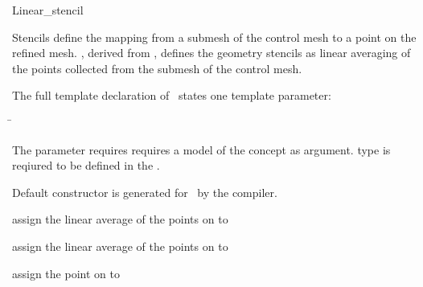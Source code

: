 \ccRefPageEnd



\begin{ccRefClass}{Linear_stencil}

\ccDefinition

Stencils define the mapping from a submesh of the control mesh to a 
point on the refined mesh. \ccClassTemplateName , derived from 
, defines the geometry stencils as linear 
averaging of the points collected from the submesh of the 
control mesh.


\ccParameters

The full template declaration of \ccClassTemplateName\ states one
template parameter:

\begin{tabbing}
 \=\\
\end{tabbing}
   
The  parameter requires requires a model of 
the  concept as argument.  
type is reqiured to be defined in the .

\ccCreation

Default constructor is generated for \ccClassTemplateName\ by the compiler.


\ccThree{}{}{}

{assign the linear average of the points on  to }

{assign the linear average of the points on  to }

{assign the point on  to }

\ccSeeAlso

\\

\end{ccRefClass}

